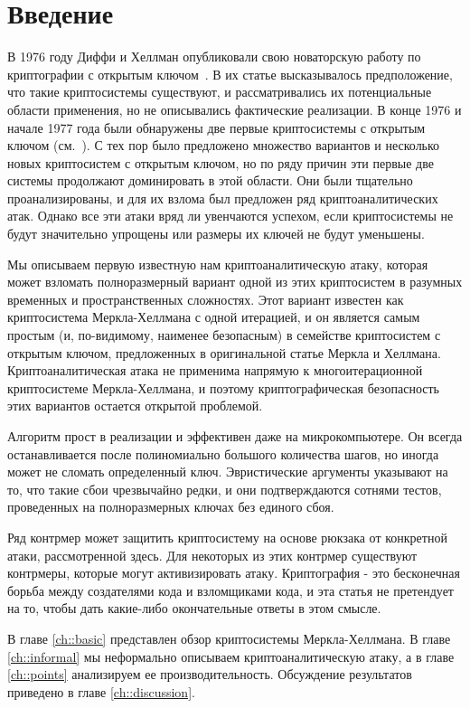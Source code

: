\documentclass[a4paper,12pt]{report}
\begin{document}
\chapter{Введение}

В 1976 году Диффи и Хеллман опубликовали свою новаторскую работу по криптографии с открытым ключом~\cite{hellman}. В их статье высказывалось предположение, что такие криптосистемы существуют, и рассматривались их потенциальные области применения, но не описывались фактические реализации. В конце 1976 и начале 1977 года были обнаружены две первые криптосистемы с открытым ключом (см.~\cite{mh,ral}). С тех пор было предложено множество вариантов и несколько новых криптосистем с открытым ключом, но по ряду причин эти первые две системы продолжают доминировать в этой области. Они были тщательно проанализированы, и
для их взлома был предложен ряд криптоаналитических атак. Однако все эти атаки вряд ли увенчаются успехом, если криптосистемы не будут значительно упрощены или размеры их ключей не будут уменьшены.

Мы описываем первую известную нам криптоаналитическую атаку, которая может взломать полноразмерный вариант одной из этих криптосистем в разумных временных и пространственных сложностях. Этот вариант известен как криптосистема Меркла-Хеллмана с одной итерацией, и он является самым простым (и, по-видимому, наименее безопасным) в семействе криптосистем с открытым ключом, предложенных в оригинальной статье Меркла и Хеллмана. Криптоаналитическая атака не применима напрямую к многоитерационной криптосистеме Меркла-Хеллмана, и поэтому криптографическая безопасность этих вариантов остается открытой проблемой.

Алгоритм прост в реализации и эффективен даже на микрокомпьютере. Он всегда останавливается после полиномиально большого количества шагов, но иногда может не сломать определенный ключ. Эвристические аргументы указывают на то, что такие сбои чрезвычайно редки, и они подтверждаются сотнями тестов, проведенных на полноразмерных ключах без единого сбоя.

Ряд контрмер может защитить криптосистему на основе рюкзака от конкретной атаки, рассмотренной здесь. Для некоторых из этих контрмер существуют контрмеры, которые могут активизировать атаку. Криптография - это бесконечная борьба между создателями кода и взломщиками кода, и эта статья не претендует на то, чтобы дать какие-либо окончательные ответы в этом смысле.

В главе \ref{ch::basic} представлен обзор криптосистемы Меркла-Хеллмана. В главе \ref{ch::informal} мы неформально описываем криптоаналитическую
атаку, а в главе \ref{ch::points} анализируем ее производительность. Обсуждение результатов приведено в главе \ref{ch::discussion}.
\end{document}
